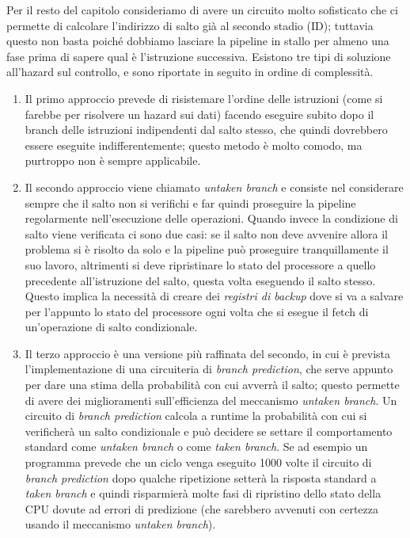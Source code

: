 Per il resto del capitolo consideriamo di avere un circuito molto sofisticato che ci permette di calcolare l’indirizzo di salto già al secondo stadio (ID); tuttavia questo non basta poiché dobbiamo lasciare la pipeline in stallo per almeno una fase prima di sapere qual è l'istruzione successiva. Esistono tre tipi di soluzione all'hazard sul controllo, e sono riportate in seguito in ordine di complessità.

\begin{enumerate}
	\item Il primo approccio prevede di risistemare l'ordine delle istruzioni (come si farebbe per risolvere un hazard sui dati) facendo eseguire subito dopo il branch delle istruzioni indipendenti dal salto stesso, che quindi dovrebbero essere eseguite indifferentemente; questo metodo è molto comodo, ma purtroppo non è sempre applicabile.
	\item Il secondo approccio viene chiamato \emph{untaken branch} e consiste nel considerare sempre che il salto non si verifichi e far quindi proseguire la pipeline regolarmente nell'esecuzione delle operazioni. Quando invece la condizione di salto viene verificata ci sono due casi: se il salto non deve avvenire allora il problema si è risolto da solo e la pipeline può proseguire tranquillamente il suo lavoro, altrimenti si deve ripristinare lo stato del processore a quello precedente all'istruzione del salto, questa volta eseguendo il salto stesso. Questo implica la necessità di creare dei \emph{registri di backup} dove si va a salvare per l'appunto lo stato del processore ogni volta che si esegue il fetch di un'operazione di salto condizionale.
	\item Il terzo approccio è una versione più raffinata del secondo, in cui è prevista l'implementazione di una circuiteria di \emph{branch prediction}, che serve appunto per dare una stima della probabilità con cui avverrà il salto; questo permette di avere dei miglioramenti sull'efficienza del meccanismo \emph{untaken branch}. Un circuito di \emph{branch prediction} calcola a runtime la probabilità con cui si verificherà un salto condizionale e può decidere se settare il comportamento standard come \emph{untaken branch} o come \emph{taken branch}. Se ad esempio un programma prevede che un ciclo venga eseguito 1000 volte il circuito di \emph{branch prediction} dopo qualche ripetizione setterà la risposta standard a \emph{taken branch} e quindi risparmierà molte fasi di ripristino dello stato della CPU dovute ad errori di predizione (che sarebbero avvenuti con certezza usando il meccanismo \emph{untaken branch}).
\end{enumerate}

